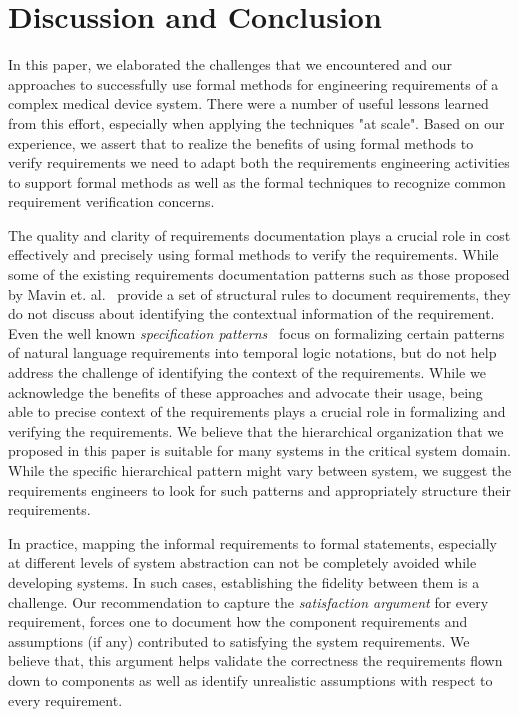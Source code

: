 \section{Discussion and Conclusion}
\label{sec:conclusion}

In this paper, we elaborated the challenges that we encountered and our approaches to successfully use formal methods for engineering requirements of a complex medical device system. There were a number of useful lessons learned from this effort, especially when applying the techniques "at scale". Based on our experience, we assert that to realize the benefits of using formal methods to verify requirements we need to adapt both the requirements engineering activities to support formal methods as well as the formal techniques to recognize common requirement verification concerns.

The quality and clarity of requirements documentation plays a crucial role in cost effectively and precisely using formal methods to verify the requirements. While some of the existing requirements documentation patterns such as those proposed by Mavin et. al.~\cite{mavin2009easy} provide a set of structural rules to document requirements, they do not discuss about identifying the contextual information of the requirement. Even the well known \emph{specification patterns}~\cite{dwyer1999patterns} focus on formalizing certain patterns of natural language requirements into temporal logic notations, but do not help address the challenge of identifying the context of the requirements. While we acknowledge the benefits of these approaches and advocate their usage, being able to precise context of the requirements plays a crucial role in formalizing and verifying the requirements. We believe that the hierarchical organization that we proposed in this paper is suitable for many systems in the critical system domain. While the specific hierarchical pattern might vary between system, we suggest the requirements engineers to look for such patterns and appropriately structure their requirements.

In practice, mapping the informal requirements to formal statements, especially at different levels of system abstraction can not be completely avoided while developing systems. In such cases, establishing the fidelity between them is a challenge. Our recommendation to capture the \emph{satisfaction argument} for every requirement, forces one to document how the component requirements and assumptions (if any)  contributed to satisfying the system requirements. We believe that, this argument helps validate the correctness the requirements flown down to components as well as identify unrealistic assumptions with respect to every requirement.

